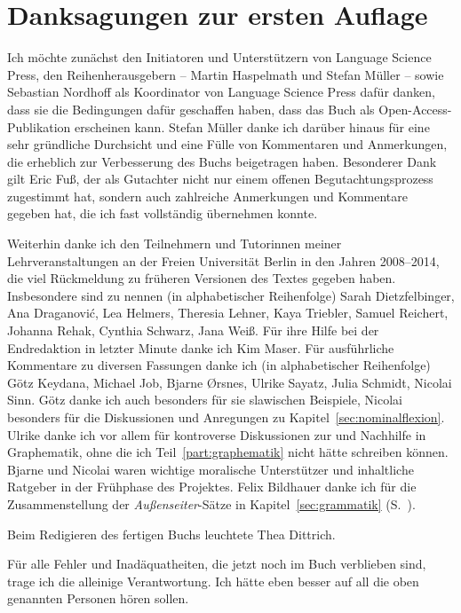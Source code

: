 \section*{Danksagungen zur ersten Auflage}
\label{sec:danksagungenzurerstenauflage}

Ich möchte zunächst den Initiatoren und Unterstützern von Language Science Press, den Reihenherausgebern -- Martin Haspelmath und Stefan Müller -- sowie Sebastian Nordhoff als Koordinator von Language Science Press dafür danken, dass sie die Bedingungen dafür geschaffen haben, dass das Buch als Open-Access-Publikation erscheinen kann.
Stefan Müller danke ich darüber hinaus für eine sehr gründliche Durchsicht und eine Fülle von Kommentaren und Anmerkungen, die erheblich zur Verbesserung des Buchs beigetragen haben.
Besonderer Dank gilt Eric Fuß, der als Gutachter nicht nur einem offenen Begutachtungsprozess zugestimmt hat, sondern auch zahlreiche Anmerkungen und Kommentare gegeben hat, die ich fast vollständig übernehmen konnte.

Weiterhin danke ich den Teilnehmern und Tutorinnen meiner Lehrveranstaltungen an der Freien Universität Berlin in den Jahren 2008--2014, die viel Rückmeldung zu früheren Versionen des Textes gegeben haben.
Insbesondere sind zu nennen (in alphabetischer Reihenfolge) Sarah Dietzfelbinger, Ana Draganovi\'{c}, Lea Helmers, Theresia Lehner, Kaya Triebler, Samuel Reichert, Johanna Rehak, Cynthia Schwarz, Jana Weiß.
Für ihre Hilfe bei der Endredaktion in letzter Minute danke ich Kim Maser.
Für ausführliche Kommentare zu diversen Fassungen danke ich (in alphabetischer Reihenfolge) Götz Keydana, Michael Job, Bjarne Ørsnes, Ulrike Sayatz, Julia Schmidt, Nicolai Sinn.
Götz danke ich auch besonders für sie slawischen Beispiele, Nicolai besonders für die Diskussionen und Anregungen zu Kapitel~\ref{sec:nominalflexion}.
Ulrike danke ich vor allem für kontroverse Diskussionen zur und Nachhilfe in Graphematik, ohne die ich Teil~\ref{part:graphematik} nicht hätte schreiben können.
Bjarne und Nicolai waren wichtige moralische Unterstützer und inhaltliche Ratgeber in der Frühphase des Projektes.
Felix Bildhauer danke ich für die Zusammenstellung der \textit{Außenseiter}-Sätze in Kapitel~\ref{sec:grammatik} (S.\ \pageref{ex:akzeptabilitaetundgrammatikalitaet007}).

Beim Redigieren des fertigen Buchs leuchtete Thea Dittrich.

Für alle Fehler und Inadäquatheiten, die jetzt noch im Buch verblieben sind, trage ich die alleinige Verantwortung.
Ich hätte eben besser auf all die oben genannten Personen hören sollen.

